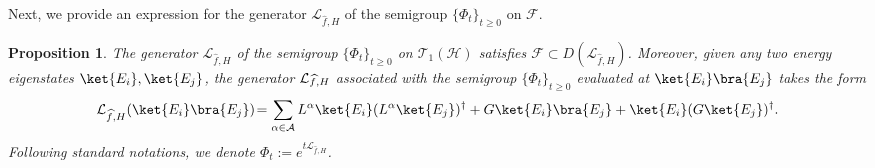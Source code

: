 \documentclass[11pt]{amsart}
\newcommand{\1}{\mathbbm{1}}
\newcommand{\cL}{\mathcal{L}}
\theoremstyle{plain}
\newtheorem{proposition}[theorem]{Proposition}
\theoremstyle{definition}
\theoremstyle{remark}
\numberwithin{equation}{section}
\begin{document}
\noindent Next, we provide an expression for the generator $\cL_{\widehat{f},H}$ of the semigroup $\{\Phi_t\}_{t\ge 0}$ on $\mathscr{F}$.
\begin{proposition}\label{propDirichlettoSchro}
The generator $\mathcal{L}_{\widehat{f},H}$ of the semigroup $\{\Phi_t\}_{t\ge 0}$ on $\mathscr{T}_1(\mathcal{H})$ satisfies  $\mathscr{F}\subset D(\mathcal{L}_{\widehat{f},H})$. Moreover, given any two energy eigenstates $\ket{E_i},\ket{E_j}$, the generator $\mathcal{L}_{\smash{\widehat{f},H}}$ associated with the semigroup $\{\Phi_t\}_{t\ge 0}$ evaluated at $\ket{E_i}\bra{E_j}$ takes the form
\begin{align}\label{eq:cLonF}
\mathcal{L}_{\widehat{f},H}(\ket{E_i}\bra{E_j})\!=\sum_{\alpha\in\mathcal{A}}L^\alpha \ket{E_i}(L^\alpha\ket{E_j})^\dagger+G\ket{E_i}\bra{E_j}+\ket{E_i}(G\ket{E_j})^\dagger. 
\end{align}
Following standard notations, we denote $\Phi_t:=e^{t\mathcal{L}_{\widehat{f},H}}$. 
\end{proposition}
\end{document}
